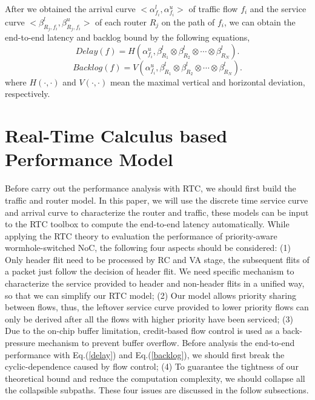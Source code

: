 \documentclass[10pt,journal]{IEEEtran}
\begin{document}
After we obtained the arrival curve $<\alpha^l_{f_i},\alpha^u_{f_i}>$ of traffic flow $f_i$ and the service curve $<\beta_{R_j,f_i}^l,\beta_{R_j,f_i}^u>$ of each router $R_j$ on the path of $f_i$, we can obtain the end-to-end latency and backlog bound by the following equations,
\begin{equation}\label{delay}
Delay(f)=H(\alpha^u_{f_i},\beta^l_{R_1}\otimes\beta^l_{R_2}\otimes\cdots\otimes\beta^l_{R_N}).
\end{equation}
\begin{equation}\label{backlog}
Backlog(f)=V(\alpha^u_{f_i},\beta^l_{R_1}\otimes\beta^l_{R_2}\otimes\cdots\otimes\beta^l_{R_N}).
\end{equation}
where $H(\cdot,\cdot)$ and $V(\cdot,\cdot)$ mean the maximal vertical and horizontal deviation, respectively.

\section{Real-Time Calculus based Performance Model}\label{modeling}
Before carry out the performance analysis with RTC, we should first build the traffic and router model. In this paper, we will use the discrete time service curve and arrival curve to characterize the router and traffic, these models can be input to the RTC toolbox \cite{rtc} to compute the end-to-end latency automatically. While applying the RTC theory to evaluation the performance of priority-aware wormhole-switched NoC, the following four aspects should be considered: (1) Only header flit need to be processed by RC and VA stage, the subsequent flits of a packet just follow the decision of header flit. We need specific mechanism to characterize the service provided to header and non-header flits in a unified way, so that we can simplify our RTC model; (2) Our model allows priority sharing between flows, thus, the leftover service curve provided to lower priority flows can only be derived after all the flows with higher priority have been serviced; (3) Due to the on-chip buffer limitation, credit-based flow control is used as a back-pressure mechanism to prevent buffer overflow. Before analysis the end-to-end performance with Eq.(\ref{delay}) and Eq.(\ref{backlog}), we should first break the cyclic-dependence caused by flow control; (4) To guarantee the tightness of our theoretical bound and reduce the computation complexity, we should collapse all the collapsible subpaths. These four issues are discussed in the follow subsections.
\end{document}
